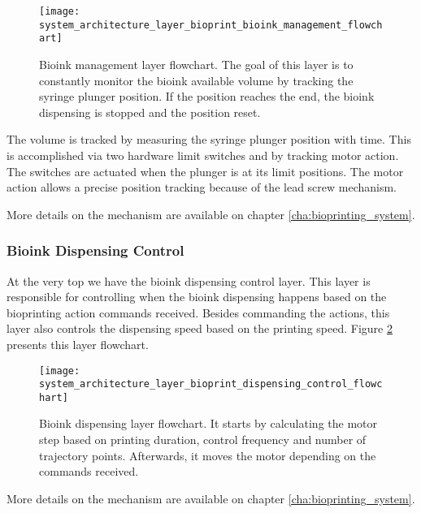 \begin{figure}[htbp]
	\centering
	\texttt{[image: system\_architecture\_layer\_bioprint\_bioink\_management\_flowchart]}
	\caption{Bioink management layer flowchart. The goal of this layer is to constantly monitor the bioink available volume by tracking the syringe plunger position. If the position reaches the end, the bioink dispensing is stopped and the position reset.}
	\label{fig:system_architecture_layer_bioprint_bioink_management_flowchart}
\end{figure}

The volume is tracked by measuring the syringe plunger position with time. This is accomplished via two hardware limit switches and by tracking motor action. The switches are actuated when the plunger is at its limit positions. The motor action allows a precise position tracking because of the lead screw mechanism. 

More details on the mechanism are available on chapter \ref{cha:bioprinting_system}.


\subsubsection*{Bioink Dispensing Control}
\label{subsubsec:system_architectural_printhead_layers_bioink_dispensing_control}

At the very top we have the bioink dispensing control layer. This layer is responsible for controlling when the bioink dispensing happens based on the bioprinting action commands received. Besides commanding the actions, this layer also controls the dispensing speed based on the printing speed. Figure \ref{fig:system_architecture_layer_bioprint_dispensing_control_flowchart} presents this layer flowchart.

\begin{figure}[htbp]
	\centering
	\texttt{[image: system\_architecture\_layer\_bioprint\_dispensing\_control\_flowchart]}
	\caption{Bioink dispensing layer flowchart. It starts by calculating the motor step based on printing duration, control frequency and number of trajectory points. Afterwards, it moves the motor depending on the commands received.}
	\label{fig:system_architecture_layer_bioprint_dispensing_control_flowchart}
\end{figure}

More details on the mechanism are available on chapter \ref{cha:bioprinting_system}.


